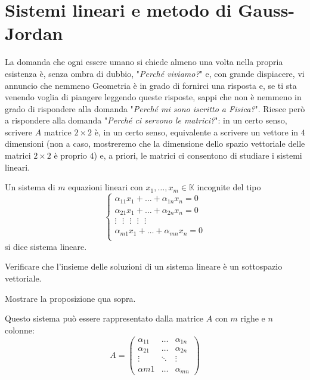 \section{Sistemi lineari e metodo di Gauss-Jordan}
La domanda che ogni essere umano si chiede almeno una volta nella propria esistenza è, senza ombra di dubbio, "\emph{Perché viviamo?}" e, con grande dispiacere, vi annuncio che nemmeno Geometria è in grado di fornirci una risposta e, se ti sta venendo
voglia di piangere leggendo queste risposte, sappi che non è nemmeno in grado di rispondere alla domanda "\emph{Perché mi sono iscritto a Fisica?}". Riesce però a rispondere alla domanda "\emph{Perché ci servono le matrici?}": in un certo senso, scrivere
$A$ matrice $2 \times 2$ è, in un certo senso, equivalente a scrivere un vettore in $4$ dimensioni (non a caso, mostreremo che la dimensione dello spazio vettoriale delle matrici $2 \times 2$ è proprio $4$) e, a priori, le matrici ci consentono di studiare i sistemi lineari.
\begin{definition}
  Un sistema di $m$ equazioni lineari con $x_1, \ldots, x_m \in \mathbb{K}$ incognite del tipo
  \begin{equation*}
    \begin{cases}
      \alpha_{11} x_1 + \ldots + \alpha_{1n} x_n = 0 \\
      \alpha_{21} x_1 + \ldots + \alpha_{2n} x_n = 0 \\
      \vdots \, \, \, \, \vdots \, \, \, \, \vdots \, \, \, \, \vdots \, \, \, \, \vdots \\
      \alpha_{m1} x_1 + \ldots + \alpha_{mn} x_n = 0 \\
    \end{cases} 
  \end{equation*}
  si dice sistema lineare.
\end{definition}
\begin{prop}
  Verificare che l'insieme delle soluzioni di un sistema lineare è un sottospazio vettoriale.
\end{prop}
\begin{exercise}
  Mostrare la proposizione qua sopra.
\end{exercise}
Questo sistema può essere rappresentato dalla matrice $A$ con $m$ righe e $n$ colonne:
$$
  A = \begin{pmatrix}
    \alpha_{11} & \ldots & \alpha_{1n} \\
    \alpha_{21} & \ldots & \alpha_{2n} \\
    \vdots &  \ddots & \vdots \\
    \alpha{m1} & \ldots & \alpha_{mn} 
  \end{pmatrix}
$$
